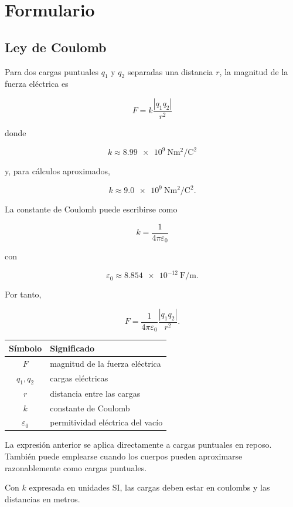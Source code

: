 \section{Formulario}

\subsection{Ley de Coulomb}

Para dos cargas puntuales \(q_1\) y \(q_2\) separadas una distancia \(r\), la magnitud de la fuerza eléctrica es

\[
\boxed{F=k\frac{|q_1q_2|}{r^2}}
\]

donde

\[
\boxed{k\approx\SI{8.99e9}{\newton\metre\squared\per\coulomb\squared}}
\]

y, para cálculos aproximados,

\[
\boxed{k\approx\SI{9.0e9}{\newton\metre\squared\per\coulomb\squared}}.
\]

La constante de Coulomb puede escribirse como

\[
\boxed{k=\frac{1}{4\pi\varepsilon_0}}
\]

con

\[
\boxed{\varepsilon_0\approx\SI{8.854e-12}{\farad\per\metre}}.
\]

Por tanto,

\[
\boxed{F=\frac{1}{4\pi\varepsilon_0}\frac{|q_1q_2|}{r^2}}.
\]

\begin{center}
\begin{tabular}{cl}
\toprule
Símbolo & Significado \\
\midrule
\(F\) & magnitud de la fuerza eléctrica \\
\(q_1,q_2\) & cargas eléctricas \\
\(r\) & distancia entre las cargas \\
\(k\) & constante de Coulomb \\
\(\varepsilon_0\) & permitividad eléctrica del vacío \\
\bottomrule
\end{tabular}
\end{center}

\begin{advertencia}
La expresión anterior se aplica directamente a cargas puntuales en reposo. También puede emplearse cuando los cuerpos pueden aproximarse razonablemente como cargas puntuales.

Con \(k\) expresada en unidades SI, las cargas deben estar en coulombs y las distancias en metros.
\end{advertencia}



